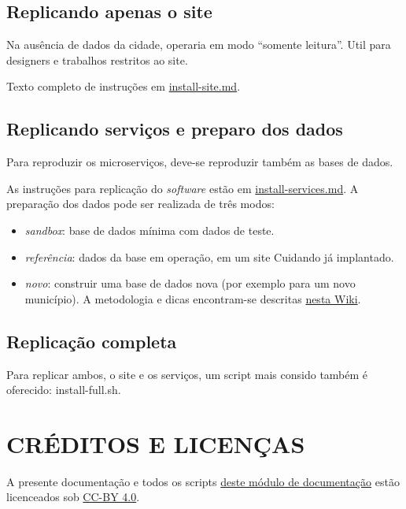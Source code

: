 \documentclass[letterpaper,10pt,portuges]{sphinxmanual}
\begin{document}
\section{Replicando apenas o site}
\label{index:replicando-apenas-o-site}
Na ausência de dados da cidade, operaria em modo ``somente leitura''. Util
para designers e trabalhos restritos ao site.

Texto completo de instruções em \href{https://github.com/okfn-brasil/cuidando2-doc/blob/master/install-services.md}{install-site.md}.


\section{Replicando serviços e preparo dos dados}
\label{index:replicando-servicos-e-preparo-dos-dados}
Para reproduzir os microserviços, deve-se reproduzir também as bases de
dados.

As instruções para replicação do \emph{software} estão em
\href{https://github.com/okfn-brasil/cuidando2-doc/blob/master/install-services.md}{install-services.md}. A preparação dos dados
pode ser realizada de três modos:
\begin{itemize}
\item {} 
\emph{sandbox}: base de dados mínima com dados de teste.

\item {} 
\emph{referência}: dados da base em operação, em um site Cuidando já
implantado.

\item {} 
\emph{novo}: construir uma base de dados nova (por exemplo para um novo
município). A metodologia e dicas encontram-se descritas \href{https://pt.wikiversity.org/wiki/Projeto\_Cuidando\_do\_Meu\_Bairro/Novos\_dados}{nesta
Wiki}.

\end{itemize}


\section{Replicação completa}
\label{index:replicacao-completa}
Para replicar ambos, o site e os serviços, um script mais consido também
é oferecido: install-full.sh.


\chapter{CRÉDITOS E LICENÇAS}
\label{index:creditos-e-licencas}
A presente documentação e todos os scripts \href{https://github.com/okfn-brasil/cuidando2-doc}{deste módulo de
documentação} estão
licenceados sob \href{http://creativecommons.org/licenses/by/4.0/}{CC-BY 4.0}.
\end{document}
